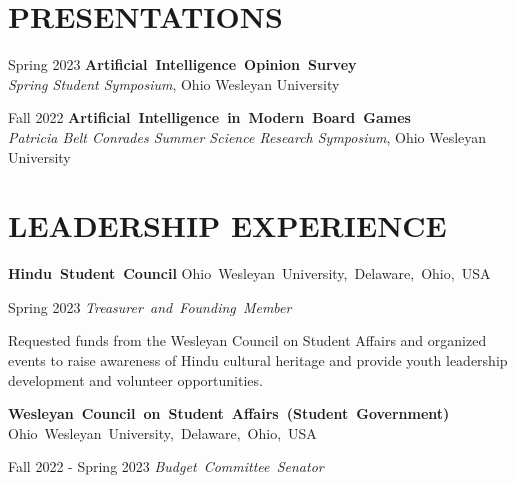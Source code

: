 \documentclass[10pt, letterpaper]{article}
\begin{document}
\section{PRESENTATIONS}

\begin{twocolentry}{Spring 2023}
    \mbox{\textbf{Artificial Intelligence Opinion Survey} }\\\textit{Spring Student Symposium}, Ohio Wesleyan University
\end{twocolentry}
\vspace{\highlightSpacing}
\begin{twocolentry}{Fall 2022}
    \mbox{\textbf{Artificial Intelligence in Modern Board Games} }\\\textit{Patricia Belt Conrades Summer Science Research Symposium}, Ohio Wesleyan University
\end{twocolentry}

\section{LEADERSHIP EXPERIENCE}

\mbox{\textbf{Hindu Student Council}}
\kern {}
\AND
\kern {}
\mbox{Ohio Wesleyan University, Delaware, Ohio, USA}

\vspace{\highlightSpacing}
\begin{twocolentry}{Spring 2023}
    \mbox{\textit{Treasurer and Founding Member}}
\end{twocolentry}

\vspace{\highlightSpacing}
\begin{onecolentry}
    \begin{highlights}
        \item Requested funds from the Wesleyan Council on Student Affairs and organized events to raise awareness of Hindu cultural heritage and provide youth leadership development and volunteer opportunities.
    \end{highlights}
\end{onecolentry}

\vspace{\entrySpacing}
\mbox{\textbf{Wesleyan Council on Student Affairs (Student Government)}}
\kern {}
\AND
\kern {}
\mbox{Ohio Wesleyan University, Delaware, Ohio, USA}

\vspace{\highlightSpacing}
\begin{twocolentry}{Fall 2022 - Spring 2023}
    \mbox{\textit{Budget Committee Senator}}
\end{twocolentry}
\end{document}
